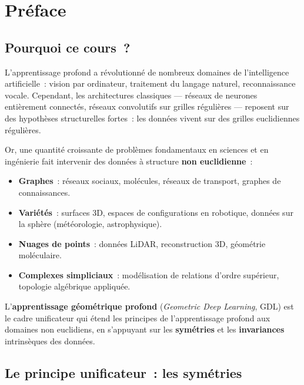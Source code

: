 \chapter*{Pr\'eface}

\section*{Pourquoi ce cours~?}

L'apprentissage profond a r\'evolutionn\'e de nombreux domaines de l'intelligence
artificielle~: vision par ordinateur, traitement du langage naturel, reconnaissance
vocale. Cependant, les architectures classiques --- r\'eseaux de neurones
enti\`erement connect\'es, r\'eseaux convolutifs sur grilles r\'eguli\`eres --- reposent
sur des hypoth\`eses structurelles fortes~: les donn\'ees vivent sur des grilles
euclidiennes r\'eguli\`eres.

Or, une quantit\'e croissante de probl\`emes fondamentaux en sciences et en
ing\'enierie fait intervenir des donn\'ees \`a structure \textbf{non euclidienne}~:
\begin{itemize}
    \item \textbf{Graphes}~: r\'eseaux sociaux, mol\'ecules, r\'eseaux de transport,
          graphes de connaissances.
    \item \textbf{Vari\'et\'es}~: surfaces 3D, espaces de configurations en robotique,
          donn\'ees sur la sph\`ere (m\'et\'eorologie, astrophysique).
    \item \textbf{Nuages de points}~: donn\'ees LiDAR, reconstruction 3D,
          g\'eom\'etrie mol\'eculaire.
    \item \textbf{Complexes simpliciaux}~: mod\'elisation de relations d'ordre
          sup\'erieur, topologie alg\'ebrique appliqu\'ee.
\end{itemize}

L'\textbf{apprentissage g\'eom\'etrique profond} (\textit{Geometric Deep Learning}, GDL) est
le cadre unificateur qui \'etend les principes de l'apprentissage profond aux
domaines non euclidiens, en s'appuyant sur les \textbf{sym\'etries} et les
\textbf{invariances} intrins\`eques des donn\'ees.

\section*{Le principe unificateur~: les sym\'etries}

